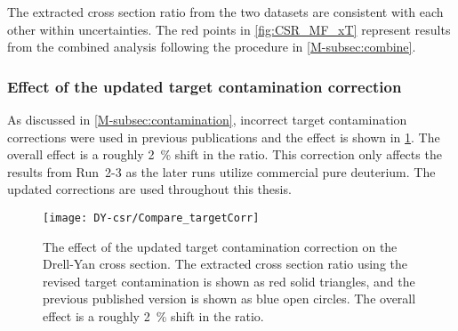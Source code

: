 \documentclass[../main.tex]{subfiles}
\begin{document}
The extracted cross section ratio from the two datasets are consistent with each other within uncertainties.
The red points in \cref{fig:CSR_MF_xT} represent results from the combined analysis following the procedure in \cref{M-subsec:combine}.
\FloatBarrier

\subsubsection{Effect of the updated target contamination correction}
\label{subsubsec:contamination_result}
As discussed in \cref{M-subsec:contamination}, incorrect target contamination corrections were used
in previous publications and the effect is shown in \cref{fig:contaimination_CSR}.
The overall effect is a roughly \SI{2}{\percent} shift in the ratio. 
This correction only affects the results from Run~2-3 as the later runs utilize commercial pure deuterium.
The updated corrections are used throughout this thesis.
\begin{figure}[htpb!]
	\centering
	\texttt{[image: DY-csr/Compare\_targetCorr]}
	\caption{The effect of the updated target contamination correction on the Drell-Yan
		cross section. The extracted cross section ratio using the revised target contamination
		is shown as red solid triangles, and the previous published version is shown as blue open
		circles. The overall effect is a roughly \SI{2}{\percent} shift in the ratio. }
	\label{fig:contaimination_CSR}
\end{figure}
\FloatBarrier
\end{document}
